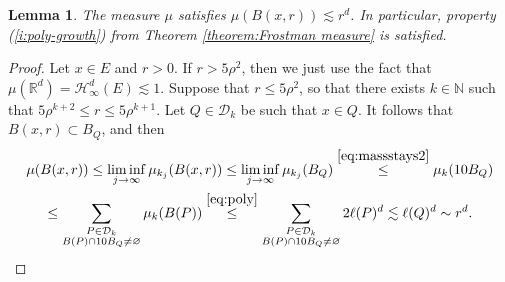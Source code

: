 \documentclass[11pt,reqno]{amsart}
\newtheorem{lemma}[theorem]{Lemma}
\theoremstyle{definition}
\theoremstyle{remark}
\numberwithin{equation}{section}
\newcommand{\R}{\mathbb{R}}
\newcommand{\N}{\mathbb{N}}
\newcommand{\hdc}{\mathcal{H}^d_\infty}
\newcommand{\dD}{\mathcal{D}}
\newcommand{\DD}{\mathcal{D}}
\theoremstyle{theorem}
\theoremstyle{definition}
\theoremstyle{remark}
\numberwithin{equation}{section}
\begin{document}
\begin{lemma}\label{l:frostmann}
	The measure $\mu$ satisfies $\mu(B(x,r)) \lesssim r^d$. In particular, property (\ref{i:poly-growth}) from Theorem \ref{theorem:Frostman measure} is satisfied.
\end{lemma}
\begin{proof}
	Let $x \in E$ and $r>0$. If $r> 5\rho^2$, then we just use the fact that $\mu(\R^d)=\hdc(E)\lesssim 1$. Suppose that $r\le 5\rho^2$, so that there exists $k \in \N$ such that $5\rho^{k+2} \leq r \leq 5\rho^{k+1}$. Let $Q \in \dD_{k}$ be such that $x\in Q$. It follows that $B(x,r) \subset B_Q$, and then
	\begin{multline*}
		\mu(B(x,r)) \le \liminf_{j \to \infty} \mu_{k_j}(B(x,r)) \leq \liminf_{j \to \infty}\mu_{k_j}(B_Q) \stackrel{\eqref{eq:massstays2}}{\leq} \mu_k(10B_Q)\\
		\le \sum_{\substack{P\in\DD_k\\ B(P)\cap 10 B_Q\neq\varnothing}} \mu_k(B(P)) \overset{\eqref{eq:poly}}{\le} \sum_{\substack{P\in\DD_k\\ B(P)\cap 10 B_Q\neq\varnothing}} 2\ell(P)^d \lesssim \ell(Q)^d\sim r^d.
	\end{multline*}
\end{proof} 
\end{document}
